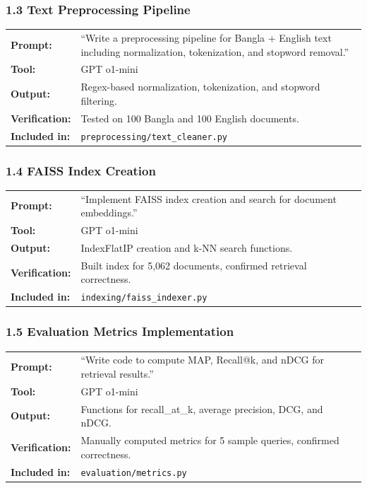 \documentclass[12pt,a4paper]{article}
\begin{document}
\subsubsection*{1.3 Text Preprocessing Pipeline}
\begin{tabular}{p{3.2cm}p{9.5cm}}
\textbf{Prompt:}        & ``Write a preprocessing pipeline for Bangla + English text including normalization, tokenization, and stopword removal.'' \\
\textbf{Tool:}          & GPT o1-mini \\
\textbf{Output:}        & Regex-based normalization, tokenization, and stopword filtering. \\
\textbf{Verification:}  & Tested on 100 Bangla and 100 English documents. \\
\textbf{Included in:}   & \texttt{preprocessing/text\_cleaner.py} \\
\end{tabular}

\subsubsection*{1.4 FAISS Index Creation}
\begin{tabular}{p{3.2cm}p{9.5cm}}
\textbf{Prompt:}        & ``Implement FAISS index creation and search for document embeddings.'' \\
\textbf{Tool:}          & GPT o1-mini \\
\textbf{Output:}        & IndexFlatIP creation and k-NN search functions. \\
\textbf{Verification:}  & Built index for 5,062 documents, confirmed retrieval correctness. \\
\textbf{Included in:}   & \texttt{indexing/faiss\_indexer.py} \\
\end{tabular}

\subsubsection*{1.5 Evaluation Metrics Implementation}
\begin{tabular}{p{3.2cm}p{9.5cm}}
\textbf{Prompt:}        & ``Write code to compute MAP, Recall@k, and nDCG for retrieval results.'' \\
\textbf{Tool:}          & GPT o1-mini \\
\textbf{Output:}        & Functions for recall\_at\_k, average precision, DCG, and nDCG. \\
\textbf{Verification:}  & Manually computed metrics for 5 sample queries, confirmed correctness. \\
\textbf{Included in:}   & \texttt{evaluation/metrics.py} \\
\end{tabular}
\end{document}
